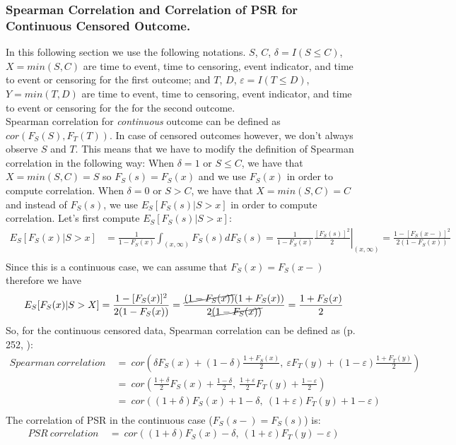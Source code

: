 \documentclass[]{article}
\let\epsilon\varepsilon
\begin{document}
\subsubsection{Spearman Correlation and Correlation of PSR for Continuous Censored Outcome.}
In this following section we use the following notations. $S$, $C$, $\delta=I(S\leq C)$, $X = min(S, C)$ are time to event, time to censoring, event indicator, and time to event or censoring for the first outcome; and $T$, $D$, $\epsilon=I(T\leq D)$, $Y = min(T, D)$ are time to event, time to censoring, event indicator, and time to event or censoring for the for the second outcome.\\
Spearman correlation for \emph{continuous} outcome can be defined as $cor(F_S(S), F_T(T))$. In case of censored outcomes however, we don't always observe $S$ and $T$. This means that we have to modify the definition of Spearman correlation in the following way: When $\delta = 1$ or $S\leq C$, we have that $X = min(S, C)=S$ so $F_S(s)=F_S(x)$ and we use $F_S(x)$ in order to compute correlation. When $\delta = 0$ or $S > C$, we have that $X = min(S, C)=C$ and instead of $F_S(s)$, we use $E_S[F_S(s)|S>x]$ in order to compute correlation. Let's first compute $E_S[F_S(s)|S>x]$:
	$$
	\begin{aligned}
		E_S[F_S(x)|S>x] &= \frac{1}{1-F_S(x)}\int_{(x, \infty)} F_S(s)dF_S(s) = \frac{1}{1-F_S(x)} \left.\frac{ [F_S(s)]^2}{2}\right|_{(x, \infty)} = \frac{1-[F_S(x-)]^2}{2(1-F_S(x))} \\
	\end{aligned}
	$$
Since this is a continuous case, we can assume that $F_S(x)=F_S(x-)$ therefore we have
	$$
	\begin{aligned}
		E_S[F_S(x)|S>X] &=\frac{1-[F_S(x)]^2}{2(1-F_S(x))}=\frac{\cancel{(1-F_S(x))}(1+F_S(x))}{2\cancel{(1-F_S(x))}}  = \frac{1+F_S(x)}{2} \\
	\end{aligned}
	$$
So, for the continuous censored data, Spearman correlation can be defined as (p. 252, \cite{dabrowska1986rank}):
	$$
	\begin{aligned}
		Spearman~correlation~&=~ cor\left(  \delta F_S(x) + (1-\delta) \frac{1+F_S(x)}{2},~\epsilon F_T(y) + (1-\epsilon) \frac{1+F_T(y)}{2}  \right)\\
		&=~ cor\left(  \frac{1+\delta}{2}F_S(x) +  \frac{1-\delta}{2},~\frac{1+\epsilon}{2}F_T(y) +  \frac{1-\epsilon}{2}  \right)\\
		&=~ cor\left(  (1+\delta)F_S(x) +  1-\delta,~(1+\epsilon)F_T(y) +  1-\epsilon  \right)\\
	\end{aligned}
	$$
The correlation of PSR in the continuous case ($F_S(s-) = F_S(s)$) is:
	$$
	\begin{aligned}
		PSR~correlation~&=~ cor\left(  (1+\delta)F_S(x) -\delta,~(1+\epsilon)F_T(y) -\epsilon  \right)\\
	\end{aligned}
	$$
\end{document}
